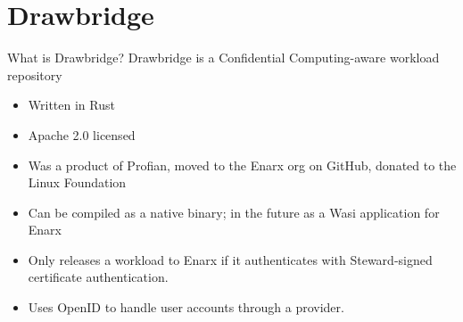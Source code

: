 \documentclass[graphics,compress]{beamer}
\begin{document}
\section{Drawbridge}
\begin{frame}{What is Drawbridge?}
Drawbridge is a Confidential Computing-aware workload repository
\begin{itemize}
    \item Written in Rust
    \item Apache 2.0 licensed
    \item Was a product of Profian, moved to the Enarx org on GitHub, donated to the Linux Foundation
    \item Can be compiled as a native binary; in the future as a Wasi application for Enarx
    \item Only releases a workload to Enarx if it authenticates with Steward-signed certificate authentication.
    \item Uses OpenID to handle user accounts through a provider.
\end{itemize}
\end{frame}
\end{document}
